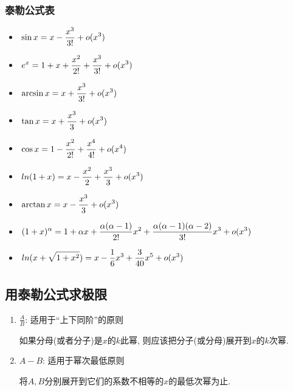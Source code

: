 \subsubsection{泰勒公式表}
\begin{multicols}{2}
    \begin{itemize}
    \item $ \displaystyle\hspace{.2em}\sin x=x-\frac{x^{3}}{3!}+o(x^{3}) $
    \item $ \displaystyle\hspace{.2em}e^{x}=1+x+\frac{x^{2}}{2!}+\frac{x^{3}}{3!}+o(x^{3}) $
    \item $ \displaystyle\hspace{.2em}\arcsin x=x+\frac{x^{3}}{3!}+o(x^{3}) $
    \item $ \displaystyle\hspace{.2em}\tan x=x+\frac{x^{3}}{3}+o(x^{3}) $
    \item $ \displaystyle\hspace{.2em}\cos x=1-\frac{x^{2}}{2!}+\frac{x^{4}}{4!}+o(x^{4}) $
    \item $ \displaystyle\hspace{.2em}ln(1+x)=x-\frac{x^{2}}{2}+\frac{x^{3}}{3}+o(x^{3}) $
    \item $ \displaystyle\hspace{.2em}\arctan x=x-\frac{x^{3}}{3}+o(x^{3}) $
    \item $ \displaystyle\hspace{.2em}(1+x)^{\alpha}=1+\alpha x+\frac{\alpha (\alpha -1)}{2!}x^{2}+\frac{\alpha (\alpha -1)(\alpha -2)}{3!}x^{3}+o(x^{3}) $
    \item $ \displaystyle\hspace{.2em}ln(x+\sqrt{1+x^2})=x-\frac{1}{6}x^3+\frac{3}{40}x^5+o(x^3) $
    \end{itemize}
\end{multicols}

\begin{figure}
    \centering %
\end{figure}



\subsection{用泰勒公式求极限}
\begin{enumerate}
\item $ \frac{A}{B} $: 适用于``上下同阶''的原则 \par
如果分母(或者分子)是$ x $的$ k $此幂, 则应该把分子(或分母)展开到$ x $的$ k $次幂.
\item $ A-B $: 适用于幂次最低原则 \par
将$ A, B $分别展开到它们的系数不相等的$ x $的最低次幂为止.
\end{enumerate}


